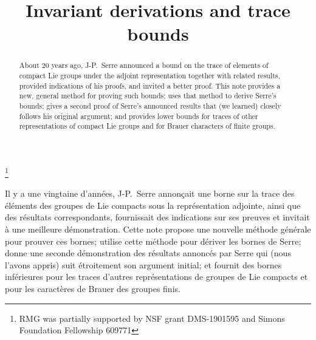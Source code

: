 \documentclass[JEP,XML,SOM,Unicode,NoFloatCountersInSection,published]{cedram}
\theoremstyle{definition}
\begin{document}
\frontmatter
\title{Invariant derivations and trace bounds}

\author[\initial{S.} \lastname{Garibaldi}]{ }
\address{IDA Center for Communications Research-La Jolla,\\
San Diego, CA 92121, USA}

\author[\initial{R.} \middlename{M.} \lastname{Guralnick}]{  }
\address{Department of Mathematics, University of Southern California,\\
Los Angeles, CA 90089-2532, USA}

\author[\initial{E.} \middlename{M.} \lastname{Rains}]{  }
\address{Department of Mathematics, California Institute of Technology,\\
1200 E California Blvd, Pasadena, CA 91125, USA}

\thanks{RMG was partially supported by NSF grant DMS-1901595 and Simons Foundation Fellowship 609771}

\begin{abstract}
About 20 years ago, J-P.~Serre announced a bound on the trace of elements of compact Lie groups under the adjoint representation together with related results, provided indications of his proofs, and invited a better proof. This note provides a new, general method for proving such bounds; uses that method to derive Serre's bounds; gives a second proof of Serre's announced results that (we learned) closely follows his original argument; and provides lower bounds for traces of other representations of compact Lie groups and for Brauer characters of finite groups.
\end{abstract}





\begin{altabstract}
Il y a une vingtaine d'années, J\nobreakdash-P.~Serre annonçait une borne sur la trace des éléments des groupes de Lie compacts sous la représentation adjointe, ainsi que des résultats correspondants, fournissait des indications sur ses preuves et invitait à une meilleure démonstration. Cette note propose une nouvelle métho\-de générale pour prouver ces bornes; utilise cette méthode pour dériver les bornes de Serre; donne une seconde démonstration des résultats annoncés par Serre qui (nous l'avons appris) suit étroitement son argument initial; et fournit des bornes inférieures pour les traces d'autres représentations de groupes de Lie compacts et pour les caractères de Brauer des groupes finis.\end{altabstract}
\end{document}
